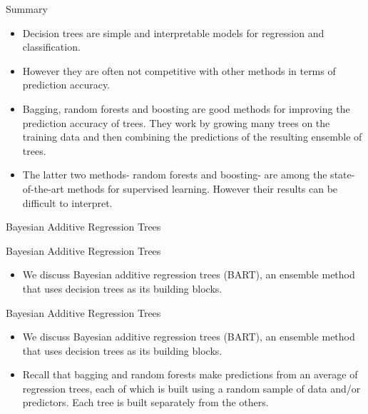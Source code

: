 \documentclass[aspectratio=169, 11pt]{beamer}
\begin{document}
\begin{frame}{Summary}
\begin{itemize}
    \item Decision trees are simple and interpretable models for regression and classification.
    \item However they are often not competitive with other methods in terms of prediction accuracy.
    \item Bagging, random forests and boosting are good methods for improving the prediction accuracy of trees. They work by growing many trees on the training data and then combining the predictions of the resulting ensemble of trees.
    \item The latter two methods- random forests and boosting- are among the state-of-the-art methods for supervised learning. However their results can be difficult to interpret.
\end{itemize}
\end{frame}

\begin{frame}{Bayesian Additive Regression Trees}
\end{frame}

\begin{frame}{Bayesian Additive Regression Trees}
\begin{itemize}
    \item We discuss Bayesian additive regression trees (BART), an ensemble method that uses decision trees as its building blocks.
\end{itemize}
\end{frame}

\begin{frame}{Bayesian Additive Regression Trees}
\begin{itemize}
    \item We discuss Bayesian additive regression trees (BART), an ensemble method that uses decision trees as its building blocks.
    \item Recall that bagging and random forests make predictions from an average of regression trees, each of which is built using a random sample of data and/or predictors. Each tree is built separately from the others.
\end{itemize}
\end{frame}
\end{document}
